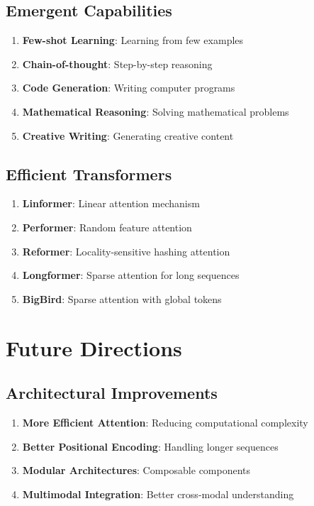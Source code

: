 \documentclass[11pt,a4paper]{article}
\begin{document}
\subsection{Emergent Capabilities}

\begin{enumerate}
\item \textbf{Few-shot Learning}: Learning from few examples
\item \textbf{Chain-of-thought}: Step-by-step reasoning
\item \textbf{Code Generation}: Writing computer programs
\item \textbf{Mathematical Reasoning}: Solving mathematical problems
\item \textbf{Creative Writing}: Generating creative content
\end{enumerate}

\subsection{Efficient Transformers}

\begin{enumerate}
\item \textbf{Linformer}: Linear attention mechanism
\item \textbf{Performer}: Random feature attention
\item \textbf{Reformer}: Locality-sensitive hashing attention
\item \textbf{Longformer}: Sparse attention for long sequences
\item \textbf{BigBird}: Sparse attention with global tokens
\end{enumerate}

\section{Future Directions}

\subsection{Architectural Improvements}

\begin{enumerate}
\item \textbf{More Efficient Attention}: Reducing computational complexity
\item \textbf{Better Positional Encoding}: Handling longer sequences
\item \textbf{Modular Architectures}: Composable components
\item \textbf{Multimodal Integration}: Better cross-modal understanding
\end{enumerate}
\end{document}
